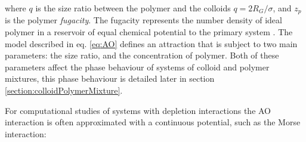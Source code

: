 \noindent where $q$ is the size ratio between the polymer and the colloids $q = 2R_G / \sigma$, and $z_p$ is the polymer \textit{fugacity}.  The fugacity represents the number density of ideal polymer in a reservoir of equal chemical potential to the primary system \cite{royall2021}. The model described in  eq. \ref{eq:AO} defines an attraction that is subject to two main parameters: the size ratio, and the concentration of polymer. Both of these parameters affect the phase behaviour of systems of colloid and polymer mixtures, this phase behaviour is detailed later in section \ref{section:colloidPolymerMixture}.

For computational studies of systems with depletion interactions the AO interaction is often approximated with a continuous potential, such as the Morse interaction:

